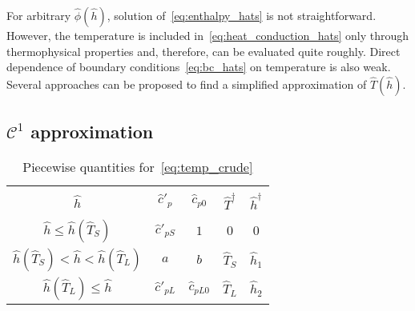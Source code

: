 \documentclass{article}
\newcommand{\Hh}{\hat{h}}
\newcommand{\HT}{\hat{T}}
\newcommand{\Hc}{\hat{c}}
\newcommand{\Hphi}{\hat{\phi}}
\begin{document}
For arbitrary \(\Hphi(\Hh)\), solution of~\eqref{eq:enthalpy_hats} is not straightforward.
However, the temperature is included in~\eqref{eq:heat_conduction_hats} only through thermophysical properties
and, therefore, can be evaluated quite roughly.
Direct dependence of boundary conditions~\eqref{eq:bc_hats} on temperature is also weak.
Several approaches can be proposed to find a simplified approximation of \(\HT(\Hh)\).

\subsection{\(\mathcal{C}^1\) approximation}

\begin{table}[ht]
    \centering
    \caption{Piecewise quantities for~\eqref{eq:temp_crude}}
    \label{table:temp_params}
    \begin{tabular}{c|cccc}
        \hline\\[-1em]
        \(\Hh\)                           & \(\Hc'_p\)    & \(\Hc_{p0}\)  & \(\HT^\dag\) & \(\Hh^\dag\) \\[0.3em]
        \hline\\[-1em]
        \(\Hh \leq \Hh(\HT_S)\)           & \(\Hc'_{pS}\) & \(1\)         & \(0\)        & \(0\)        \\[0.3em]
        \(\Hh(\HT_S) < \Hh < \Hh(\HT_L)\) & \(a\)         & \(b\)         & \(\HT_S\)    & \(\Hh_1\)    \\[0.3em]
        \(\Hh(\HT_L) \leq \Hh\)           & \(\Hc'_{pL}\) & \(\Hc_{pL0}\) & \(\HT_L\)    & \(\Hh_2\)    \\[0.3em]
        \hline
    \end{tabular}
\end{table}
\end{document}
